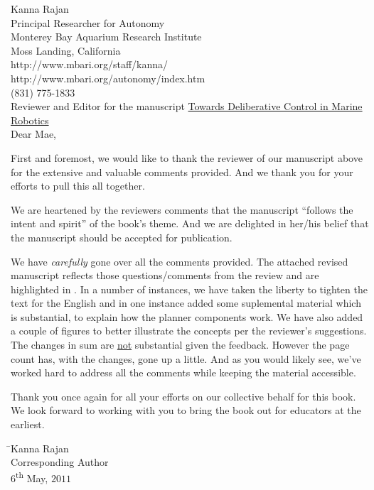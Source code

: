 \documentclass[11pt,twoside]{article}
\begin{document}
\thispagestyle{empty}
\pagestyle{empty}
\setlength{\parindent}{0pt} 
\setlength{\parskip}{2ex}


\small{Kanna Rajan}\\
\small{Principal Researcher for Autonomy}\\
\small{Monterey Bay Aquarium Research Institute}\\
\small{Moss Landing, California}\\
\small{http://www.mbari.org/staff/kanna/}\\
\small{http://www.mbari.org/autonomy/index.htm}\\
\small{(831) 775-1833}\\


Reviewer and Editor for the manuscript \textsf{\underline{Towards Deliberative Control in Marine Robotics}}\\


Dear Mae,

First and foremost, we would like to thank the reviewer of our
manuscript above for the extensive and valuable comments provided. And
we thank you for your efforts to pull this all together.

We are heartened by the reviewers comments that the manuscript
``follows the intent and spirit'' of the book's theme. And we are
delighted in her/his belief that the manuscript should be accepted for
publication.

We have \emph{carefully} gone over all the comments provided. The
attached revised manuscript reflects those questions/comments from the
review and are highlighted in  . In a number of
instances, we have taken the liberty to tighten the text for the
English and in one instance added some suplemental material which is
substantial, to explain how the \eu planner components work. We have
also added a couple of figures to better illustrate the concepts per
the reviewer's suggestions. The changes in sum are \underline{not}
substantial given the feedback. However the page count has, with the
changes, gone up a little. And as you would likely see, we've worked
hard to address all the comments while keeping the material
accessible.

Thank you once again for all your efforts on our collective behalf for
this book. We look forward to working with you to bring the book out
for educators at the earliest.


\vspace{+2cm}
\begin{tabbing}
\hspace{+10cm}\=\small{Kanna Rajan}\\
\>\small{Corresponding Author}\\
\>\small{6\textsuperscript{th} May, $2011$}
\end{tabbing}
\end{document}
